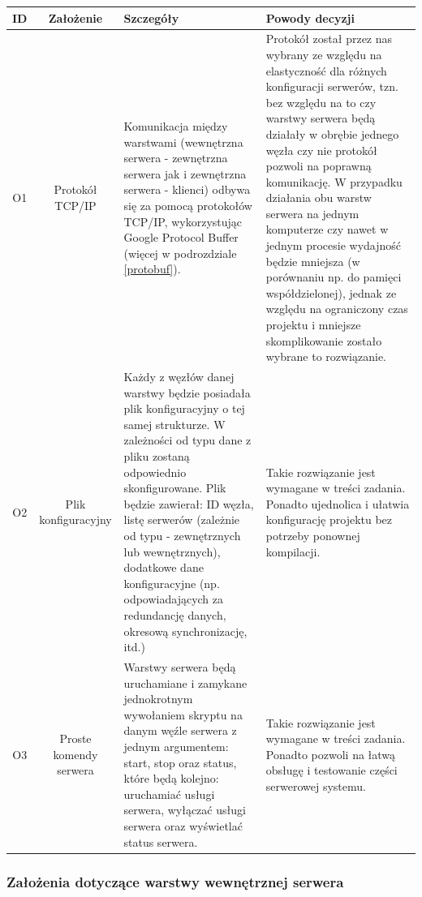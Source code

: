 \begin{center}

\begin{tabular}{|c|c|l|l|}
\hline
\textbf{ID} & \textbf{Założenie} & \textbf{Szczegóły} & \textbf{Powody decyzji} \\
\hline
\label{z:o1} O1 & 
Protokół TCP/IP & 
Komunikacja między warstwami (wewnętrzna serwera - zewnętrzna serwera jak i zewnętrzna serwera - klienci) odbywa się za pomocą protokołów TCP/IP, wykorzystując Google Protocol Buffer (więcej w podrozdziale \ref{protobuf}).
& Protokół został przez nas wybrany ze względu na elastyczność dla różnych konfiguracji serwerów, tzn. bez względu na to czy warstwy serwera będą działały w obrębie jednego węzła czy nie protokół pozwoli na poprawną komunikację. W przypadku działania obu warstw serwera na jednym komputerze czy nawet w jednym procesie wydajność będzie mniejsza (w porównaniu np. do pamięci współdzielonej), jednak ze względu na ograniczony czas projektu i mniejsze skomplikowanie zostało wybrane to rozwiązanie. \\
\hline
\label{z:o2} O2 & Plik konfiguracyjny & 
 Każdy z węzłów danej warstwy będzie posiadała plik konfiguracyjny o tej samej strukturze. W zależności od typu dane z pliku zostaną odpowiednio skonfigurowane. Plik będzie zawierał: ID węzła, listę serwerów (zależnie od typu - zewnętrznych lub wewnętrznych), dodatkowe dane konfiguracyjne (np. odpowiadających za redundancję danych, okresową synchronizację, itd.) &
Takie rozwiązanie jest wymagane w treści zadania. Ponadto ujednolica i ułatwia konfigurację projektu bez potrzeby ponownej kompilacji.\\
\hline
\label{z:o3} O3 & Proste komendy serwera &  
Warstwy serwera będą uruchamiane i zamykane jednokrotnym wywołaniem skryptu na danym węźle serwera z jednym argumentem: start, stop oraz status, które będą kolejno: uruchamiać usługi serwera, wyłączać usługi serwera oraz wyświetlać status serwera. & 
Takie rozwiązanie jest wymagane w treści zadania. Ponadto pozwoli na łatwą obsługę i testowanie części serwerowej systemu. \\
\hline

\end{tabular} 

\subsubsection*[Założenia dotyczące warstwy wewnętrznej serwera]{Założenia dotyczące warstwy wewnętrznej serwera} \label{z:sw}


\end{center}
